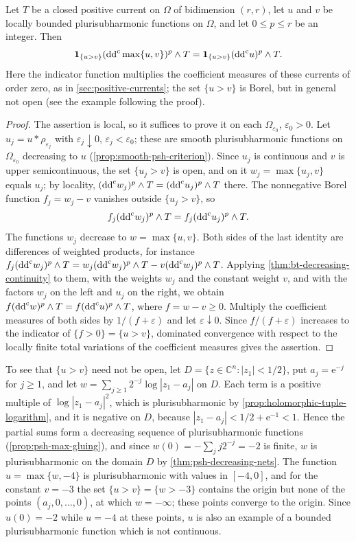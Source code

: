 \begin{proposition}\label{prop:bt-maximum-locality}
Let $T$ be a closed positive current on $\Omega$ of bidimension $(r,r)$, let $u$ and $v$ be locally bounded plurisubharmonic functions on $\Omega$, and let $0\le p\le r$ be an integer. Then
\[
 \mathbf1_{\{u>v\}}(\mathrm{dd}^{\mathrm{c}}\max\{u,v\})^p\wedge T
 =\mathbf1_{\{u>v\}}(\mathrm{dd}^{\mathrm{c}} u)^p\wedge T.
\]
Here the indicator function multiplies the coefficient measures of these currents of order zero, as in \cref{sec:positive-currents}; the set $\{u>v\}$ is Borel, but in general not open (see the example following the proof).
\end{proposition}
\begin{proof}
The assertion is local, so it suffices to prove it on each $\Omega_{\varepsilon_0}$, $\varepsilon_0>0$. Let $u_j=u*\rho_{\varepsilon_j}$ with $\varepsilon_j\downarrow0$, $\varepsilon_j<\varepsilon_0$; these are smooth plurisubharmonic functions on $\Omega_{\varepsilon_0}$ decreasing to $u$ (\cref{prop:smooth-psh-criterion}). Since $u_j$ is continuous and $v$ is upper semicontinuous, the set $\{u_j>v\}$ is open, and on it $w_j=\max\{u_j,v\}$ equals $u_j$; by locality, $(\mathrm{dd}^{\mathrm{c}} w_j)^p\wedge T=(\mathrm{dd}^{\mathrm{c}} u_j)^p\wedge T$ there. The nonnegative Borel function $f_j=w_j-v$ vanishes outside $\{u_j>v\}$, so
\[
 f_j(\mathrm{dd}^{\mathrm{c}} w_j)^p\wedge T=f_j(\mathrm{dd}^{\mathrm{c}} u_j)^p\wedge T.
\]
The functions $w_j$ decrease to $w=\max\{u,v\}$. Both sides of the last identity are differences of weighted products, for instance $f_j(\mathrm{dd}^{\mathrm{c}} w_j)^p\wedge T=w_j(\mathrm{dd}^{\mathrm{c}} w_j)^p\wedge T-v(\mathrm{dd}^{\mathrm{c}} w_j)^p\wedge T$. Applying \cref{thm:bt-decreasing-continuity} to them, with the weights $w_j$ and the constant weight $v$, and with the factors $w_j$ on the left and $u_j$ on the right, we obtain $f(\mathrm{dd}^{\mathrm{c}} w)^p\wedge T=f(\mathrm{dd}^{\mathrm{c}} u)^p\wedge T$, where $f=w-v\ge0$. Multiply the coefficient measures of both sides by $1/(f+\varepsilon)$ and let $\varepsilon\downarrow0$. Since $f/(f+\varepsilon)$ increases to the indicator of $\{f>0\}=\{u>v\}$, dominated convergence with respect to the locally finite total variations of the coefficient measures gives the assertion.
\end{proof}

To see that $\{u>v\}$ need not be open, let $D=\{z\in\mathbb C^n:|z_1|<1/2\}$, put $a_j=\mathrm e^{-j}$ for $j\ge1$, and let $w=\sum_{j\ge1}2^{-j}\log|z_1-a_j|$ on $D$. Each term is a positive multiple of $\log|z_1-a_j|^2$, which is plurisubharmonic by \cref{prop:holomorphic-tuple-logarithm}, and it is negative on $D$, because $|z_1-a_j|<1/2+\mathrm e^{-1}<1$. Hence the partial sums form a decreasing sequence of plurisubharmonic functions (\cref{prop:psh-max-gluing}), and since $w(0)=-\sum_jj2^{-j}=-2$ is finite, $w$ is plurisubharmonic on the domain $D$ by \cref{thm:psh-decreasing-nets}. The function $u=\max\{w,-4\}$ is plurisubharmonic with values in $[-4,0]$, and for the constant $v=-3$ the set $\{u>v\}=\{w>-3\}$ contains the origin but none of the points $(a_j,0,\ldots,0)$, at which $w=-\infty$; these points converge to the origin. Since $u(0)=-2$ while $u=-4$ at these points, $u$ is also an example of a bounded plurisubharmonic function which is not continuous.

